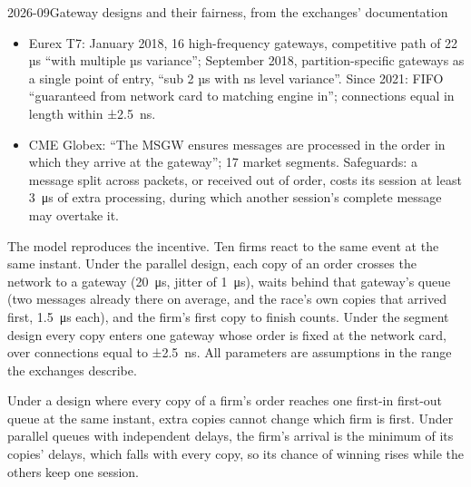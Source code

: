 \begin{dated}{2026-09}{Gateway designs and their fairness, from the exchanges' documentation}\label{dat:nw:futures-connectivity:gateways}
\begin{itemize}
\item Eurex T7: January 2018, 16 high-frequency gateways, competitive path of 22 µs ``with multiple µs variance''; September
  2018, partition-specific gateways as a single point of entry, ``sub 2 µs with ns level variance''. Since 2021: FIFO
  ``guaranteed from network card to matching engine in'';  connections equal in length within ±2.5~ns.
\item CME Globex: ``The MSGW ensures messages are processed in the order in which they arrive at the gateway''; 17 market
  segments. Safeguards: a message split across packets, or received out of order, costs its session at least
  \qty{3}{\micro\second} of extra processing, during which another session's complete message may overtake it.
\end{itemize}
\end{dated}

The model reproduces the incentive. Ten firms react to the same event at the same instant. Under the parallel design, each
copy of an order crosses the network to a gateway (\qty{20}{\micro\second}, jitter of \qty{1}{\micro\second}), waits behind that
gateway's queue (two messages already there on average, and the race's own copies that arrived first,
\qty{1.5}{\micro\second} each), and the firm's first copy to finish counts. Under the segment design every copy enters one
gateway whose order is fixed at the network card, over connections equal to ±2.5~ns. All parameters are assumptions in the
range the exchanges describe.

\label{lst:nw:futures-connectivity:race}

\begin{proposition}\label{prop:nw:futures-connectivity:copies}
Under a design where every copy of a firm's order reaches one first-in first-out queue at the same instant, extra copies cannot
change which firm is first. Under parallel queues with independent delays, the firm's arrival is the minimum of its copies'
delays, which falls with every copy, so its chance of winning rises while the others keep one session.
\end{proposition}

